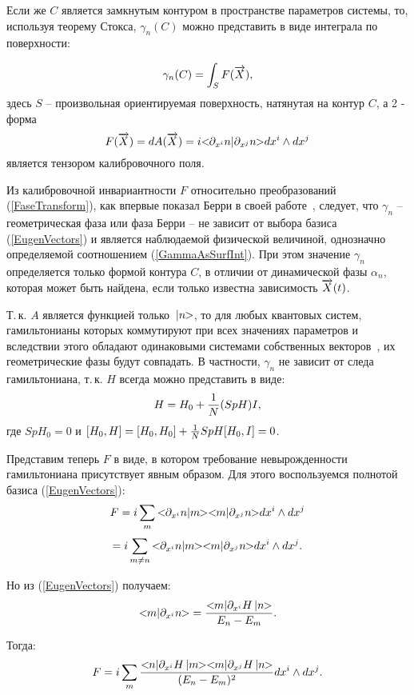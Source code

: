 \documentclass[a4paper,titlepage]{article}
\newcommand{\MathBr}[1]{\ifmmode{#1} \else{$#1$} \fi}
\newcommand{\KetVect}[1]{\MathBr{\,|#1\!\!>}}
\newcommand{\BraVect}[1]{\MathBr{<\!\!#1|}}
\newcommand{\DirProd}[2]{\MathBr{<\!\!#1|#2\!\!>}}
\newcommand{\XVect}{\MathBr{\overrightarrow{X}}}
\newcommand{\rf}[1]{(\ref{#1})}
\newcommand{\der}[1]{\MathBr{\partial_{#1}}}
\begin{document}
Если же $C$ является замкнутым контуром в пространстве параметров системы,
то, используя теорему Стокса, $\gamma_n(C)$ можно представить в виде
интеграла по поверхности:

\begin{equation}
  \gamma_n(C) = \int_S F(\XVect),
\label{GammaAsSurfInt}
\end{equation}
  здесь $S$ -- произвольная ориентируемая поверхность,
натянутая на контур $C$, а 2 - форма
\begin{equation}
  F(\XVect) = dA(\XVect) = i \DirProd{\der{x^i}n}{\der{x^j}n} dx^i \wedge dx^j
\label{FFromN}
\end{equation}
 является тензором калибровочного поля.

Из калибровочной инвариантности $F$ относительно преобразований
\rf{FaseTransform}, как впервые показал Берри в своей
работе~\cite{FirstBerryWork}, следует, что $\gamma_n$ -- геометрическая
фаза или фаза Берри -- не зависит от выбора базиса \rf{EugenVectors} и
является наблюдаемой физической величиной, однозначно определяемой
соотношением \rf{GammaAsSurfInt}. При этом значение $\gamma_n$ определяется
только формой контура $C$, в отличии от динамической фазы
$\alpha_n$, которая может быть найдена, если только известна зависимость
$\XVect(t)$.

Т.\,к. $A$ является функцией только $\KetVect{n}$, то для
любых квантовых систем, гамильтонианы которых коммутируют при всех значениях
параметров и вследствии этого обладают одинаковыми системами собственных
векторов~\cite{AboutMatrix}, их геометрические фазы будут совпадать.
В частности, $\gamma_n$ не зависит от следа гамильтониана,
т.\,к. $H$ всегда можно представить в виде:
\begin{equation}
   H = H_0 + {1 \over N}(SpH)I,
\label{ZeroSP}
\end{equation}
 где $SpH_0 = 0$ и $[H_0, H] = [H_0, H_0] + {1 \over N}SpH[H_0, I] = 0$.

Представим теперь $F$ в виде, в котором требование невырожденности
гамильтониана присутствует явным образом. Для этого воспользуемся
полнотой базиса \rf{EugenVectors}:
\[
  F = i \sum_{m} \DirProd{\der{x^i}n}{m}\DirProd{m}{\der{x^j}n}
    dx^i \wedge dx^j
\]
\[
  = i \sum_{m \ne n} \DirProd{\der{x^i}n}{m}\DirProd{m}{\der{x^j}n}
    dx^i \wedge dx^j.
\]

Но из \rf{EugenVectors} получаем:
\[
  \DirProd{m}{\der{x^i}n} =
    {\BraVect{m}\der{x^i}H\KetVect{n} \over E_n - E_m }.
\]

Тогда:
\begin{equation}
  F = i \sum_{m}
  {\BraVect{n}\der{x^i}H\KetVect{m} \BraVect{m}\der{x^j}H\KetVect{n}
     \over (E_n - E_m)^2 } dx^i \wedge dx^j.
\label{FAsSum}
\end{equation}
\end{document}
